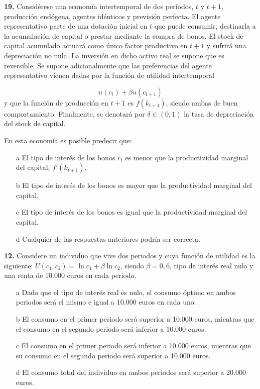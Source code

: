 \documentclass{nuevotema}
\begin{document}
\textbf{19.} Considérese una economía intertemporal de dos periodos, $t$ y $t+1$, producción endógena, agentes idénticos y previsión perfecta. El agente representativo parte de una dotación inicial en $t$ que puede consumir, destinarla a la acumulación de capital o prestar mediante la compra de bonos. El stock de capital acumulado actuará como único factor productivo en $t+1$ y sufrirá una depreciación no nula. La inversión en dicho activo real se supone que es reversible. Se supone adicionalmente que las preferencias del agente representativo vienen dadas por la función de utilidad intertemporal

\begin{equation*}
    u(c_t) + \beta u(c_{t+1})
\end{equation*}
y que la función de producción en $t+1$ es $f(k_{t+1})$, siendo ambas de buen comportamiento. Finalmente, se denotará por $\delta \in (0,1)$ la tasa de depreciación del stock de capital.

En esta economía es posible predecir que:

\begin{enumerate}
    \item[a] El tipo de interés de los bonos $r_t$ es menor que la productividad marginal del capital, $f'(k_{t+1})$.
    \item[b] El tipo de interés de los bonos es mayor que la productividad marginal del capital.
    \item[c] El tipo de interés de los bonos es igual que la productividad marginal del capital.
    \item[d] Cualquier de las respuestas anteriores podría ser correcta.
\end{enumerate}


\textbf{12.} Considere un individuo que vive dos periodos y cuya función de utilidad es la siguiente: $U(c_1, c_2) = \ln c_1 + \beta \ln c_2$, siendo $\beta = 0,6$, tipo de interés real nulo y una renta de 10.000 euros en cada periodo.

\begin{enumerate}
    \item[a] Dado que el tipo de interés real es nulo, el consumo óptimo en ambos periodos será el mismo e igual a 10.000 euros en cada uno.
    \item[b] El consumo en el primer periodo será superior a 10.000 euros, mientras que el consumo en el segundo periodo será inferior a 10.000 euros.
    \item[c] El consumo en el primer periodo será inferior a 10.000 euros, mientras que su consumo en el segundo periodo será superior a 10.000 euros.
    
    \item[d] El consumo total del individuo en ambos periodos será superior a 20.000 euros.
\end{enumerate}
\end{document}
